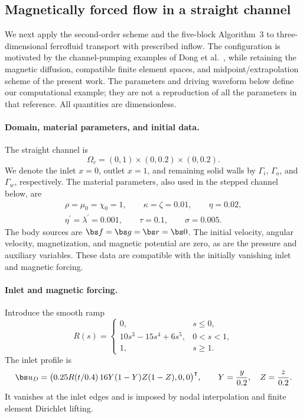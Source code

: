 \subsection{Magnetically forced flow in a straight channel}
\label{subsec:straight-channel}
We next apply the second-order scheme and the five-block Algorithm~3
to three-dimensional ferrofluid transport with prescribed inflow.
The configuration is motivated by the channel-pumping examples of
Dong et al.~\cite{DongHuangHuangYang2026}, while retaining the magnetic
diffusion, compatible finite element spaces, and midpoint/extrapolation
scheme of the present work. The parameters and driving waveform below
define our computational example; they are not a reproduction of all
the parameters in that reference. All quantities are dimensionless.

\paragraph{Domain, material parameters, and initial data.}
The straight channel is
\[
  \Omega_c=(0,1)\times(0,0.2)\times(0,0.2).
\]
We denote the inlet $x=0$, outlet $x=1$, and remaining solid walls by
$\Gamma_i$, $\Gamma_o$, and $\Gamma_w$, respectively.
The material parameters, also used in the stepped channel below, are
\begin{equation}\label{eq:channel-material-parameters}
\begin{gathered}
 \rho=\mu_0=\chi_0=1,\qquad
 \kappa=\zeta=0.01,\qquad \eta=0.02,\\
 \eta^{\prime}=\lambda^{\prime}=0.001,\qquad
 \tau=0.1,\qquad \sigma=0.005.
\end{gathered}
\end{equation}
The body sources are $\bs f=\bs g=\bs r=\bs0$.
The initial velocity, angular velocity, magnetization, and magnetic
potential are zero, as are the pressure and auxiliary variables.
These data are compatible with the initially vanishing inlet and
magnetic forcing.

\paragraph{Inlet and magnetic forcing.}
Introduce the smooth ramp
\begin{equation}\label{eq:channel-ramp}
 R(s)=\begin{cases}
 0,&s\leq0,\\
 10s^3-15s^4+6s^5,&0<s<1,\\
 1,&s\geq1.
 \end{cases}
\end{equation}
The inlet profile is
\begin{equation}\label{eq:channel-inlet}
 \bs u_D=\bigl(0.25R(t/0.4)\,16Y(1-Y)Z(1-Z),0,0\bigr)^{\intercal},
 \qquad Y=\frac{y}{0.2},\quad Z=\frac{z}{0.2}.
\end{equation}
It vanishes at the inlet edges and is imposed by nodal interpolation
and finite element Dirichlet lifting.

